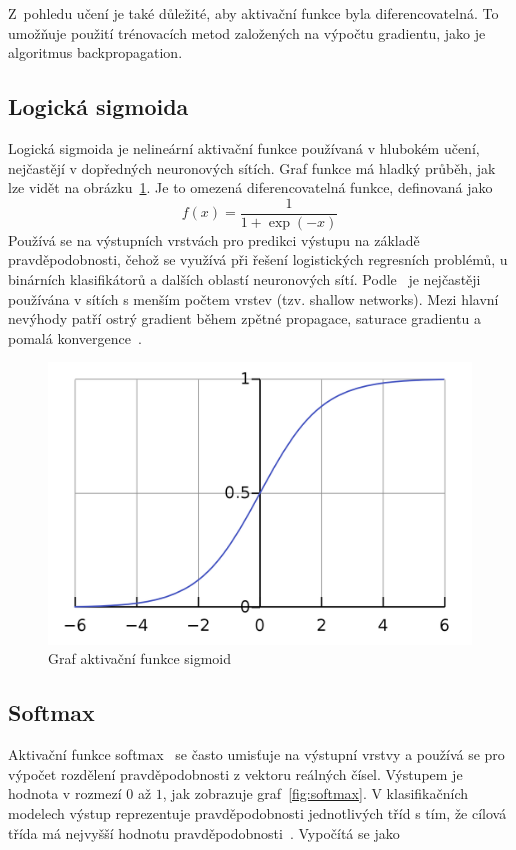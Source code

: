 Z~pohledu učení je také důležité, aby aktivační funkce byla diferencovatelná. To umožňuje použití trénovacích metod založených na výpočtu gradientu, jako je algoritmus backpropagation.



\subsection*{Logická sigmoida}
Logická sigmoida je nelineární aktivační funkce používaná v hlubokém učení, nejčastějí v dopředných neuronových sítích. Graf funkce má hladký průběh, jak lze vidět na obrázku~\ref{fig:sigmoid}. Je to omezená diferencovatelná funkce, definovaná jako
\begin{equation}
  f(x) = \frac{1}{1+\exp(-x)}
\end{equation}
Používá se na výstupních vrstvách pro predikci výstupu na základě pravděpodobnosti, čehož se využívá při řešení logistických regresních problémů, u binárních klasifikátorů a dalších oblastí neuronových sítí. Podle~\cite{NEAL199271} je nejčastěji používána v sítích s menším počtem vrstev (tzv. shallow networks). Mezi hlavní nevýhody patří ostrý gradient během zpětné propagace, saturace gradientu a pomalá konvergence~\cite{nwankpa2018activation}.

\begin{figure}[H]
    \centering
    \includegraphics[scale=0.18]{obrazky-figures/sigmoid.png}
    \caption{\label{fig:sigmoid}Graf aktivační funkce sigmoid}
\end{figure}



\subsection*{Softmax}
Aktivační funkce softmax~\cite{mitdeeplearning} se často umisťuje na výstupní vrstvy a používá se pro výpočet rozdělení pravděpodobnosti z vektoru reálných čísel. Výstupem je hodnota v rozmezí $0$ až $1$, jak zobrazuje graf~\ref{fig:softmax}. V klasifikačních modelech výstup reprezentuje pravděpodobnosti jednotlivých tříd s tím, že cílová třída má nejvyšší hodnotu pravděpodobnosti~\cite{nwankpa2018activation}. Vypočítá se jako


